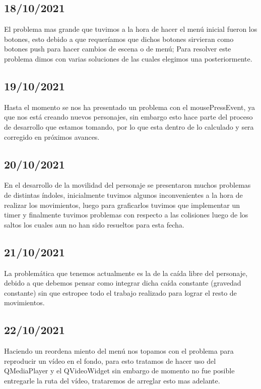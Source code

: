 \documentclass{article}
\begin{document}
    \subsection{18/10/2021}
    El problema mas grande que tuvimos a la hora de hacer el menú inicial fueron los botones, esto debido a que requeríamos que dichos botones sirvieran como botones push para hacer cambios de escena o de menú; Para resolver este problema dimos con varias soluciones de las cuales elegimos una posteriormente.
    
    \subsection{19/10/2021}    
    Hasta el momento se nos ha presentado un problema con el mousePressEvent, ya que nos está creando nuevos personajes, sin embargo esto hace parte del proceso de desarrollo que estamos tomando, por lo que esta dentro de lo calculado y sera corregido en próximos avances.
    
    \subsection{20/10/2021}
    En el desarrollo de la movilidad del personaje se presentaron muchos problemas de distintas índoles, inicialmente tuvimos algunos inconvenientes a la hora de realizar los movimientos, luego para graficarlos tuvimos que implementar un timer y finalmente tuvimos problemas con respecto a las colisiones luego de los saltos los cuales aun no han sido resueltos para esta fecha.
    
    \subsection{21/10/2021}
    La problemática que tenemos actualmente es la de la caída libre del personaje, debido a que debemos pensar como integrar dicha caída constante (gravedad constante) sin que estropee todo el trabajo realizado para lograr el resto de movimientos.
    
    \subsection{22/10/2021}
    Haciendo un reordena miento del menú nos topamos con el problema para reproducir un vídeo en el fondo, para esto tratamos de hacer uso del QMediaPlayer y el QVideoWidget sin embargo de momento no fue posible entregarle la ruta del vídeo, trataremos de arreglar esto mas adelante.
    
\end{document}
